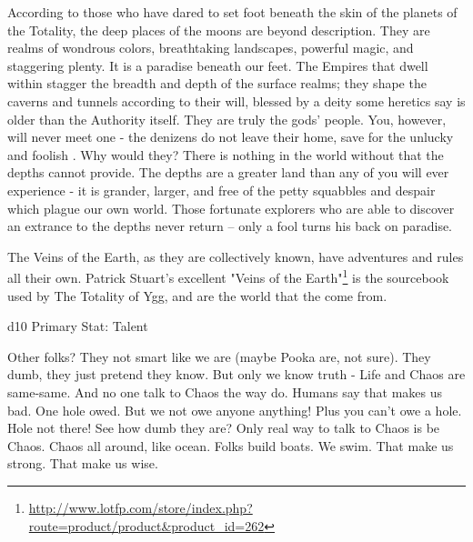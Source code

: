 {  According to those who have dared to set foot beneath the skin of the planets of the Totality, the deep places of the moons are beyond description.  They are realms of wondrous colors, breathtaking landscapes, powerful magic, and staggering plenty.  It is a paradise beneath our feet.  The Empires that dwell within stagger the breadth and depth of the surface realms; they shape the caverns and tunnels according to their will, blessed by a deity some heretics say is older than the Authority itself.  They are truly the gods' people.  You, however, will never meet one - the denizens do not leave their home, save for the unlucky and foolish .  Why would they?  There is nothing in the world without that the depths cannot provide.  The depths are a greater land than any of you will ever experience - it is grander, larger, and free of the petty squabbles and despair which plague our own world.  Those fortunate explorers who are able to discover an extrance to the depths never return -- only a fool turns his back on paradise.

  The Veins of the Earth, as they are collectively known, have adventures and rules all their own.  Patrick Stuart's excellent "Veins of the Earth"\footnote{\url{http://www.lotfp.com/store/index.php?route=product/product&product_id=262}{}} is the sourcebook used by The Totality of Ygg, and are the world that the  come from.

\newpage


  \FLESH d10 \hfill Primary Stat: Talent


  Other folks? They not smart like we are (maybe Pooka are, not sure).  They dumb, they just pretend they know.  But only we know truth - Life and Chaos are same-same.  And no one talk to Chaos the way  do. Humans say that makes us bad. One hole owed.  But we not owe anyone anything! Plus you can't owe a hole. Hole not there! See how dumb they are? Only real way to talk to Chaos is be Chaos.  Chaos all around, like ocean. Folks build boats.  We swim.  That make us strong. That make us wise.

}
